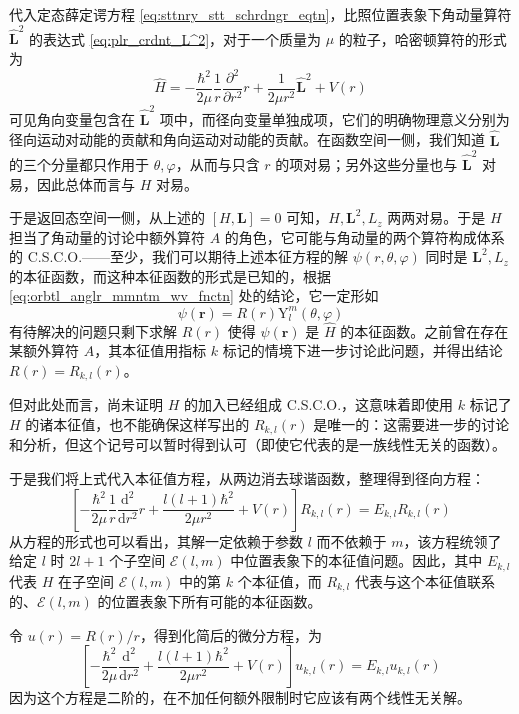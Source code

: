 \documentclass[cn,10pt,math=newtx,citestyle=gb7714-2015,bibstyle=gb7714-2015]{elegantbook}
\def\bm{\boldsymbol}
\def\ms{\mathscr}
\def\mr{\mathrm}
\def\d{\mathrm d}
\def\vphi{\varphi}
\begin{document}
代入定态薛定谔方程 \ref{eq:sttnry_stt_schrdngr_eqtn}，比照位置表象下角动量算符 $\hat{\bm L}^2$ 的表达式 \ref{eq:plr_crdnt_L^2}，对于一个质量为 $\mu$ 的粒子，哈密顿算符的形式为
\begin{equation}
    \hat H = -\frac{\hbar^2}{2\mu}\frac 1 r\frac{\partial^2}{\partial r^2}r+\frac 1{2\mu r^2}\hat{\bm L}^2+V(r)
\end{equation}
可见角向变量包含在 $\hat{\bm L}^2$ 项中，而径向变量单独成项，它们的明确物理意义分别为径向运动对动能的贡献和角向运动对动能的贡献。在函数空间一侧，我们知道 $\hat{\bm L}$ 的三个分量都只作用于 $\theta,\vphi$，从而与只含 $r$ 的项对易；另外这些分量也与 $\hat{\bm L}^2$ 对易，因此总体而言与 $H$ 对易。

于是返回态空间一侧，从上述的 $[H,\bm L]=0$ 可知，$H,\bm L^2,L_z$ 两两对易。于是 $H$ 担当了角动量的讨论中额外算符 $A$ 的角色，它可能与角动量的两个算符构成体系的 C.S.C.O.——至少，我们可以期待上述本征方程的解 $\psi(r,\theta,\vphi)$ 同时是 $\bm L^2,L_z$ 的本征函数，而这种本征函数的形式是已知的，根据 \ref{eq:orbtl_anglr_mmntm_wv_fnctn} 处的结论，它一定形如
\begin{equation}
    \psi(\bm r)=R(r)\mr Y_l^m(\theta,\vphi)
\end{equation}
有待解决的问题只剩下求解 $R(r)$ 使得 $\psi(\bm r)$ 是 $\hat H$ 的本征函数。之前曾在存在某额外算符 $A$，其本征值用指标 $k$ 标记的情境下进一步讨论此问题，并得出结论 $R(r)=R_{k,l}(r)$。

\begin{remark}
但对此处而言，尚未证明 $H$ 的加入已经组成 C.S.C.O.，这意味着即使用 $k$ 标记了 $H$ 的诸本征值，也不能确保这样写出的 $R_{k,l}(r)$ 是唯一的：这需要进一步的讨论和分析，但这个记号可以暂时得到认可（即使它代表的是一族线性无关的函数）。
\end{remark}

于是我们将上式代入本征值方程，从两边消去球谐函数，整理得到径向方程：
\begin{equation}\label{eq:rdl_eqtn_cntl_fld}
    \left[-\frac{\hbar^2}{2\mu}\frac 1 r\frac{\d^2}{\d r^2}r+\frac{l(l+1)\hbar^2}{2\mu r^2}+V(r)\right]R_{k,l}(r)=E_{k,l}R_{k,l}(r)
\end{equation}
从方程的形式也可以看出，其解一定依赖于参数 $l$ 而不依赖于 $m$，该方程统领了给定 $l$ 时 $2l+1$ 个子空间 $\ms E(l,m)$ 中位置表象下的本征值问题。因此，其中 $E_{k,l}$ 代表 $H$ 在子空间 $\ms E(l,m)$ 中的第 $k$ 个本征值，而 $R_{k,l}$ 代表与这个本征值联系的、$\ms E(l,m)$ 的位置表象下所有可能的本征函数。

令 $u(r)=R(r)/r$，得到化简后的微分方程，为
\begin{equation}\label{eq:rdcd_rdl_eqtn_cntl_fld}
    \left[-\frac{\hbar^2}{2\mu}\frac{\d^2}{\d r^2}+\frac{l(l+1)\hbar^2}{2\mu r^2}+V(r)\right]u_{k,l}(r)=E_{k,l}u_{k,l}(r)
\end{equation}
因为这个方程是二阶的，在不加任何额外限制时它应该有两个线性无关解。
\end{document}

